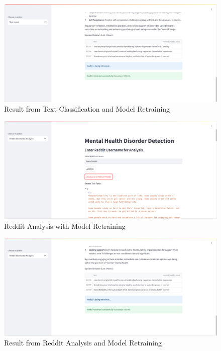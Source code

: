 \begin{figure}[h!]  
    \centering
    \includegraphics[width=1.0\textwidth]{App Images/15 Interface.png}  
    \caption{Result from Text Classification and Model Retraining}
    \label{102i}  %
\end{figure}

\pagebreak

\begin{figure}[h!]  
    \centering
    \includegraphics[width=1.0\textwidth]{App Images/16 Interface.png}  
    \caption{Reddit Analysis with Model Retraining}
    \label{10i}  %
\end{figure}

\begin{figure}[h!]  
    \centering
    \includegraphics[width=1.0\textwidth]{App Images/17 Interface.png}  
    \caption{Result from Reddit Analysis and Model Retraining}
    \label{10i}  %
\end{figure}



